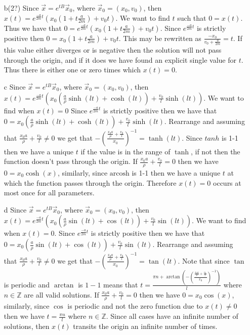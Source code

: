 \documentclass[12pt, letterpaper]{article}
\newcommand{\Z}{\mathbb{Z}}
\begin{document}
\begin{enumerate}
\begin{enumerate}
		\item[b(2?)]
			Since $\Vec{x} = e^{tB}\Vec{x}_0$, where $\Vec{x}_0 = (x_0,v_0)$, then $x(t) = e^{\frac{-a}{2m}t}(x_0(1+t\frac{a}{2m}) + v_0 t)$.  We want to find $t$ such that $0 = x(t)$.  Thus we have that $0 = e^{\frac{-a}{2m}t}(x_0(1+t\frac{a}{2m}) + v_0 t)$.  Since $e^{\frac{-a}{2m}t}$ is strictly positive then $0 = x_0(1+t\frac{a}{2m}) + v_0 t$.  This may be rewritten as $ \frac{-x_0}{v_0 + \frac{a}{2m}} = t$.  If this value either diverges or is negative then the solution will not pass through the origin, and if it does we have found an explicit single value for $t$.  Thus there is either one or zero times which $x(t) = 0$.  
		\item[c] Since $\Vec{x} = e^{tB}\Vec{x}_0$, where $\Vec{x}_0 = (x_0,v_0)$, then $x(t) = e^{\frac{-a}{2m}t}(x_0 ( \frac{a}{\rho} \sinh(lt) + \cosh(lt)) + \frac{v_0}{l} \sinh(lt))$.  We want to find when $x(t) = 0$  Since $e^{\frac{-a}{2m}t}$ is strictly positive then we have that $ 0=x_0 ( \frac{a}{\rho} \sinh(lt) + \cosh(lt)) + \frac{v_0}{l} \sinh(lt)$.  Rearrange and assuming that $\frac{x_0 a}{\rho} + \frac{v_0}{l} \neq 0$ we get that $ -(\frac{\frac{x_0 a}{\rho} + \frac{v_0}{l}}{x_0})^{-1} = \tanh(lt)$.  Since $tanh$ is 1-1 then we have a unique $t$ if the value is in the range of $\tanh$, if not then the function doesn't pass through the origin.  If $\frac{x_0 a}{\rho} + \frac{v_0}{l} = 0$ then we have $0= x_0 \cosh(x)$, similarly, since $\text{arcosh}$ is 1-1 then we have a unique $t$ at which the function passes through the origin.  Therefore $x(t) = 0$ occurs at most once for all parameters.  
		\item[d] Since $\Vec{x} = e^{tB}\Vec{x}_0$, where $\Vec{x}_0 = (x_0,v_0)$, then $x(t) = e^{\frac{-a}{2m}t}(x_0 ( \frac{a}{\rho} \sin(lt) + \cos(lt)) + \frac{v_0}{l} \sin(lt))$. We want to find when $x(t) = 0$.  Since $e^{\frac{-a}{2m}t}$ is strictly positive then we have that $ 0=x_0 ( \frac{a}{\rho} \sin(lt) + \cos(lt)) + \frac{v_0}{l} \sin(lt)$.  Rearrange and assuming that $\frac{x_0 a}{\rho} + \frac{v_0}{l} \neq 0$ we get that $ -(\frac{\frac{x_0 a}{\rho} + \frac{v_0}{l}}{x_0})^{-1} = \tan(lt)$.  Note that since $\tan$ is periodic and $\arctan$ is $1-1$ means that $t = \frac{\pi n + \arctan(-(\frac{\frac{x_0 a}{\rho} + \frac{v_0}{l}}{x_0})^{-1})}{l}$ where $n \in \Z$ are all valid solutions.  If $\frac{x_0 a}{\rho} + \frac{v_0}{l} = 0$ then we have $0= x_0 \cos(x)$, similarly, since $\cos$ is periodic and not the zero function due to $x(t) \neq 0$ then we have $t=\frac{\pi n}{l}$ where $n \in \Z$.  Since all cases have an infinite number of solutions, then $x(t)$ transits the origin an infinite number of times.\newline

\end{enumerate}
\end{enumerate}
\end{document}

